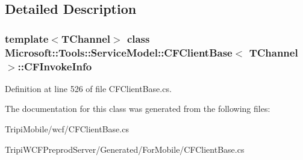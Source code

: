 \subsection{Detailed Description}
\subsubsection*{template$<$TChannel$>$ class Microsoft::Tools::ServiceModel::CFClientBase$<$ TChannel $>$::CFInvokeInfo}



Definition at line 526 of file CFClientBase.cs.

The documentation for this class was generated from the following files:\begin{DoxyCompactItemize}
\item 
TripiMobile/wcf/CFClientBase.cs\item 
TripiWCFPreprodServer/Generated/ForMobile/CFClientBase.cs\end{DoxyCompactItemize}
